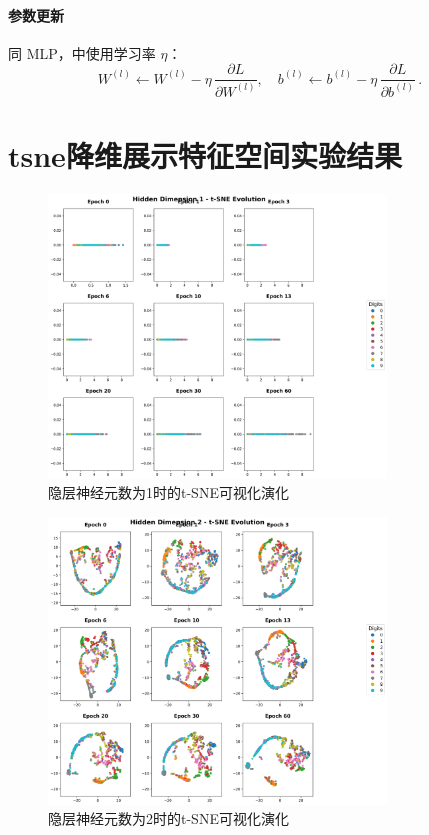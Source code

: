 \paragraph{参数更新}  
同 MLP，中使用学习率 $\eta$：
\[
W^{(l)} \leftarrow W^{(l)} - \eta\,\frac{\partial L}{\partial W^{(l)}},\quad
b^{(l)} \leftarrow b^{(l)} - \eta\,\frac{\partial L}{\partial b^{(l)}}\,.
\]



\section{tsne降维展示特征空间实验结果}\label{sec:hidden}
\begin{figure}[H]
    \centering
    \includegraphics[width=0.8\textwidth]{../images/pa/tsne_evolution_hidden_1.png}
    \caption{隐层神经元数为1时的t-SNE可视化演化}
    \label{fig:1}
\end{figure}
\begin{figure}[H]
    \centering
    \includegraphics[width=0.8\textwidth]{../images/pa/tsne_evolution_hidden_2.png}
    \caption{隐层神经元数为2时的t-SNE可视化演化}
    \label{fig:2}
\end{figure}
